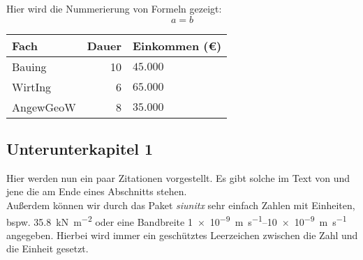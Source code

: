	Hier wird die Nummerierung von Formeln gezeigt:
	\begin{equation}
		a=b
	\end{equation}
	
	\begin{table}
		\label{tbl:tabularx}
		\centering
		\begin{tabularx}{8cm}{lrX} 
			\toprule
			Fach & Dauer & Einkommen (€)\\ 
			\midrule 
			Bauing & 10 & $45.000$ \\
			WirtIng & 6 & $65.000$ \\
			AngewGeoW & 8 & $35.000$\\ 
			\bottomrule
		\end{tabularx}
	\end{table}


\subsection{Unterunterkapitel 1}
	Hier werden nun ein paar Zitationen vorgestellt. Es gibt solche im Text von \textcite{alam_effects_2014} und jene die am Ende eines Abschnitts stehen. \parencites{bailey_technology_2018}{alam_effects_2014}{dassault_systemes_abaqus_2017}{dassault_systemes_abaqus_2019}
	\\
	\cite{richardson_permeability_1987}
	Außerdem können wir durch das Paket \emph{siunitx} sehr einfach Zahlen mit Einheiten, bspw.	\SI{35.8}{\kilo\newton\per\square\meter} oder eine Bandbreite \SIrange{1e-9}{10e-9}{\meter\per\second} angegeben. Hierbei wird immer ein geschütztes Leerzeichen zwischen die Zahl und die Einheit gesetzt.
	
	\blindtext \parencite{alireza_hassanzadegan_thermomechanical_2012}